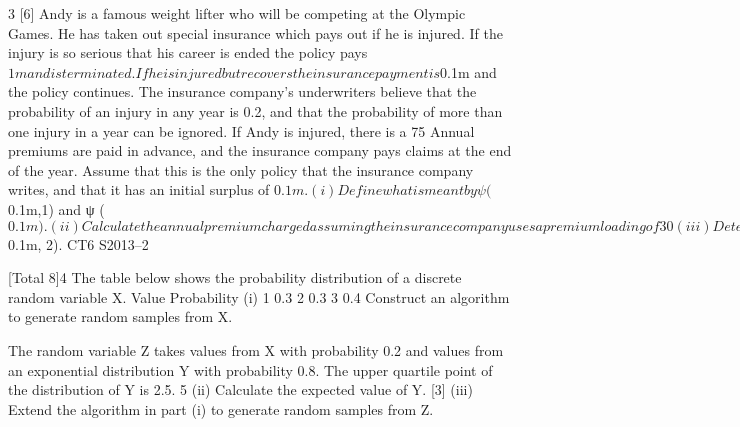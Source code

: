 \documentclass[a4paper,12pt]{article}
\begin{document}
3
[6]
Andy is a famous weight lifter who will be competing at the Olympic Games. He has
taken out special insurance which pays out if he is injured. If the injury is so serious
that his career is ended the policy pays $1m and is terminated. If he is injured but
recovers the insurance payment is $0.1m and the policy continues.
The insurance company’s underwriters believe that the probability of an injury in any
year is 0.2, and that the probability of more than one injury in a year can be ignored.
If Andy is injured, there is a 75%
Annual premiums are paid in advance, and the insurance company pays claims at the
end of the year. Assume that this is the only policy that the insurance company
writes, and that it has an initial surplus of $0.1m.
(i) Define what is meant by ψ ($0.1m,1) and ψ ($0.1m).
(ii) Calculate the annual premium charged assuming the insurance company uses a
premium loading of 30%

(iii) Determine ψ ($0.1m, 2).
CT6 S2013–2


[Total 8]4
The table below shows the probability distribution of a discrete random variable X.
Value
Probability
(i)
1
0.3
2
0.3
3
0.4
Construct an algorithm to generate random samples from X.

The random variable Z takes values from X with probability 0.2 and values from an
exponential distribution Y with probability 0.8. The upper quartile point of the
distribution of Y is 2.5.
5
(ii) Calculate the expected value of Y.
[3]
(iii) Extend the algorithm in part (i) to generate random samples from Z.
\end{document}
